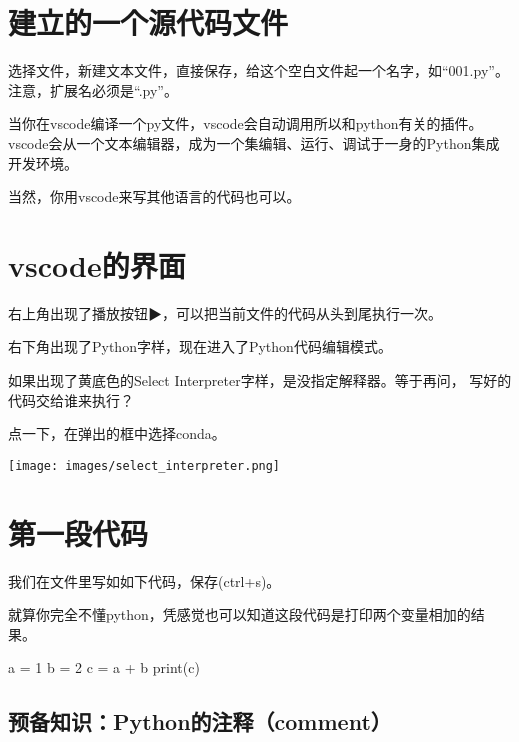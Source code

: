 \documentclass[
  letterpaper,
  DIV=11,
  numbers=noendperiod]{scrreprt}
\newenvironment{Shaded}{\begin{snugshade}}{\end{snugshade}}
\newcommand{\BuiltInTok}[1]{\textcolor[rgb]{0.00,0.23,0.31}{#1}}
\newcommand{\DecValTok}[1]{\textcolor[rgb]{0.68,0.00,0.00}{#1}}
\newcommand{\NormalTok}[1]{\textcolor[rgb]{0.00,0.23,0.31}{#1}}
\newcommand{\OperatorTok}[1]{\textcolor[rgb]{0.37,0.37,0.37}{#1}}
\begin{document}
\hypertarget{ux5efaux7acbux7684ux4e00ux4e2aux6e90ux4ee3ux7801ux6587ux4ef6}{%
\section{建立的一个源代码文件}\label{ux5efaux7acbux7684ux4e00ux4e2aux6e90ux4ee3ux7801ux6587ux4ef6}}

选择文件，新建文本文件，直接保存，给这个空白文件起一个名字，如``001.py''。
注意，扩展名必须是``.py''。

当你在vscode编译一个py文件，vscode会自动调用所以和python有关的插件。
vscode会从一个文本编辑器，成为一个集编辑、运行、调试于一身的Python集成开发环境。

当然，你用vscode来写其他语言的代码也可以。

\hypertarget{vscodeux7684ux754cux9762}{%
\section{vscode的界面}\label{vscodeux7684ux754cux9762}}

右上角出现了播放按钮▶，可以把当前文件的代码从头到尾执行一次。

右下角出现了Python字样，现在进入了Python代码编辑模式。

如果出现了黄底色的Select Interpreter字样，是没指定解释器。等于再问，
写好的代码交给谁来执行？

点一下，在弹出的框中选择conda。

\texttt{[image: images/select\_interpreter.png]}

\hypertarget{ux7b2cux4e00ux6bb5ux4ee3ux7801}{%
\section{第一段代码}\label{ux7b2cux4e00ux6bb5ux4ee3ux7801}}

我们在文件里写如如下代码，保存(ctrl+s)。

就算你完全不懂python，凭感觉也可以知道这段代码是打印两个变量相加的结果。

\begin{Shaded}
\begin{Highlighting}[]
\NormalTok{a }\OperatorTok{=} \DecValTok{1}
\NormalTok{b }\OperatorTok{=} \DecValTok{2}
\NormalTok{c }\OperatorTok{=}\NormalTok{ a }\OperatorTok{+}\NormalTok{ b}
\BuiltInTok{print}\NormalTok{(c)}
\end{Highlighting}
\end{Shaded}

\hypertarget{ux9884ux5907ux77e5ux8bc6pythonux7684ux6ce8ux91cacomment}{%
\subsection{预备知识：Python的注释（comment）}\label{ux9884ux5907ux77e5ux8bc6pythonux7684ux6ce8ux91cacomment}}
\end{document}
